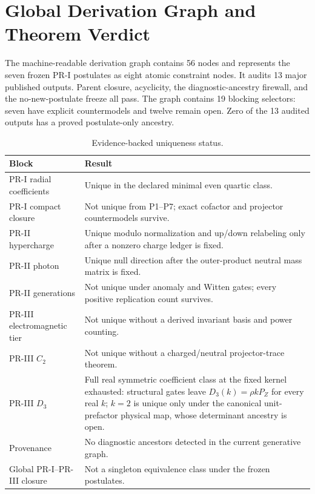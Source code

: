 \section{Global Derivation Graph and Theorem Verdict}
\label{sec:derivation-graph-verdict}

The machine-readable derivation graph contains 56 nodes and represents the
seven frozen PR-I postulates as eight atomic constraint nodes.  It audits 13
major published outputs.  Parent closure, acyclicity, the diagnostic-ancestry
firewall, and the no-new-postulate freeze all pass.  The graph contains 19
blocking selectors: seven have explicit countermodels and twelve remain open.
Zero of the 13 audited outputs has a proved postulate-only ancestry.

\begin{table}[H]
\centering
\caption{Evidence-backed uniqueness status.}
\label{tab:pr35-status}
\begin{tabularx}{\textwidth}{@{}p{}X@{}}
\toprule
Block & Result \\
\midrule
PR-I radial coefficients & Unique in the declared minimal even quartic class. \\
PR-I compact closure & Not unique from P1--P7; exact cofactor and projector countermodels survive. \\
PR-II hypercharge & Unique modulo normalization and up/down relabeling only after a nonzero charge ledger is fixed. \\
PR-II photon & Unique null direction after the outer-product neutral mass matrix is fixed. \\
PR-II generations & Not unique under anomaly and Witten gates; every positive replication count survives. \\
PR-III electromagnetic tier & Not unique without a derived invariant basis and power counting. \\
PR-III $C_2$ & Not unique without a charged/neutral projector-trace theorem. \\
PR-III $D_3$ & Full real symmetric coefficient class at the fixed kernel exhausted: structural gates leave $D_3(k)=\rho kP_Z$ for every real $k$; $k=2$ is unique only under the canonical unit-prefactor physical map, whose determinant ancestry is open. \\
Provenance & No diagnostic ancestors detected in the current generative graph. \\
Global PR-I--PR-III closure & Not a singleton equivalence class under the frozen postulates. \\
\bottomrule
\end{tabularx}
\end{table}


